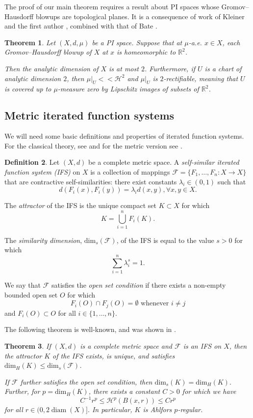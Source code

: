 \documentclass{amsart}
\DeclareMathOperator{\diam}{diam}
\theoremstyle{plain}
\newtheorem{theorem}{Theorem}
\theoremstyle{definition}
\newtheorem{definition}[theorem]{Definition}
\numberwithin{equation}{section}
\numberwithin{theorem}{section}
\newcommand{\Hdim}{\text{dim}_H}
\newcommand{\Sdim}{\text{dim}_s}
\newcommand{\RR}{\mathbb{R}}
\newcommand{\HH}{\mathcal{H}}
\newcommand{\cF}{\mathcal{F}}
\begin{document}
The proof of our main theorem requires a result about PI spaces whose Gromov--Hausdorff blowups are topological planes. It is a consequence of work of Kleiner and the first author \cite[Theorem 1.3 and Remark 1.4]{DavidKleiner}, combined with that of Bate \cite[Theorem 6.6]{Bate}.
\begin{theorem}\label{thm:davidkleiner}
Let $(X,d,\mu)$ be a PI space. Suppose that at $\mu$-a.e. $x\in X$, each Gromov--Hausdorff blowup of $X$ at $x$ is homeomorphic to $\mathbb{R}^2$.

Then the analytic dimension of $X$ is at most $2$. Furthermore, if $U$ is a chart of analytic dimension $2$, then $\mu|_U<<\mathcal{H}^2$ and $\mu|_U$ is $2$-rectifiable, meaning that $U$ is covered up to $\mu$-measure zero by Lipschitz images of subsets of $\RR^2$.
\end{theorem}

\subsection{Metric iterated function systems}

We will need some basic definitions and properties of iterated function systems. For the classical theory, see \cite{falconer,hutchinson} and for the metric version see \cite{stella}.

\begin{definition}\label{def:IFS} Let $(X,d)$ be a complete metric space. A \emph{self-similar iterated function system (IFS)} on $X$ is a collection of mappings $\cF=\{F_1, \dots, F_n:X\to X\}$ that are contractive self-similarities: there exist constants $\lambda_i\in (0,1)$ such that
\[
d(F_i(x),F_i(y))=\lambda_i d(x,y), \forall x,y\in X.
\]

The \emph{attractor} of the IFS is the unique compact set $K\subset X$ for which 
\[
K=\bigcup_{i=1}^n F_i(K).
\]

The \emph{similarity dimension}, $\Sdim(\cF)$, of the IFS is equal to the value $s>0$ for which
\[
\sum_{i=1}^n \lambda_i^s = 1.
\]

We say that $\cF$ satisfies the \emph{open set condition} if there exists a non-empty bounded open set $O$ for which 
\[
F_i(O)\cap F_j(O)=\emptyset \text{ whenever } i\neq j
\]
and $F_i(O)\subset O$ for all $i\in\{1,\dots, n\}$.
\end{definition}

The following theorem is well-known, and was shown in \cite{stella}.
\begin{theorem}\label{thm:IFS} If $(X,d)$ is a complete metric space and $\cF$ is an IFS on $X$, then the attractor $K$ of the IFS exists, is unique, and satisfies $\Hdim(K)\leq \Sdim(\cF)$.

If $\cF$ further satisfies the open set condition, then $\Sdim(K)=\Hdim(K)$. Further, for $p=\Hdim(K)$, there exists a constant $C>0$ for which we have 
\[
C^{-1} r^{p} \leq \HH^p(B(x,r)) \leq C r^p
\]
for all $r \in (0,2\diam(X)].$ In particular, $K$ is Ahlfors $p$-regular.
\end{theorem}
\end{document}
